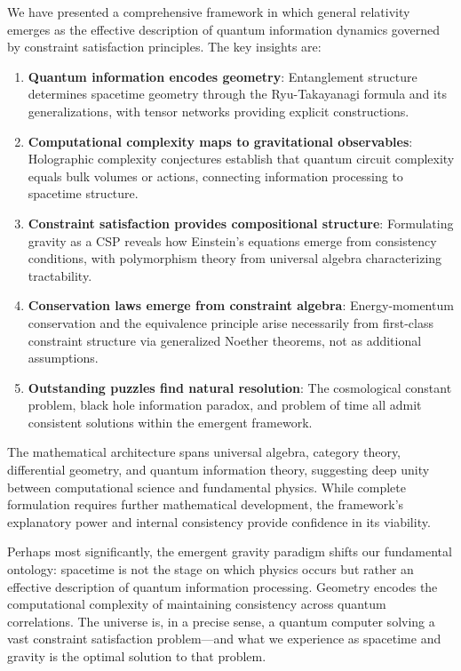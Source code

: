 \documentclass[11pt,a4paper]{article}
\theoremstyle{remark}
\theoremstyle{definition}
\begin{document}
We have presented a comprehensive framework in which general relativity emerges as the effective description of quantum information dynamics governed by constraint satisfaction principles. The key insights are:

\begin{enumerate}
\item \textbf{Quantum information encodes geometry}: Entanglement structure determines spacetime geometry through the Ryu-Takayanagi formula and its generalizations, with tensor networks providing explicit constructions.

\item \textbf{Computational complexity maps to gravitational observables}: Holographic complexity conjectures establish that quantum circuit complexity equals bulk volumes or actions, connecting information processing to spacetime structure.

\item \textbf{Constraint satisfaction provides compositional structure}: Formulating gravity as a CSP reveals how Einstein's equations emerge from consistency conditions, with polymorphism theory from universal algebra characterizing tractability.

\item \textbf{Conservation laws emerge from constraint algebra}: Energy-momentum conservation and the equivalence principle arise necessarily from first-class constraint structure via generalized Noether theorems, not as additional assumptions.

\item \textbf{Outstanding puzzles find natural resolution}: The cosmological constant problem, black hole information paradox, and problem of time all admit consistent solutions within the emergent framework.
\end{enumerate}

The mathematical architecture spans universal algebra, category theory, differential geometry, and quantum information theory, suggesting deep unity between computational science and fundamental physics. While complete formulation requires further mathematical development, the framework's explanatory power and internal consistency provide confidence in its viability.

Perhaps most significantly, the emergent gravity paradigm shifts our fundamental ontology: spacetime is not the stage on which physics occurs but rather an effective description of quantum information processing. Geometry encodes the computational complexity of maintaining consistency across quantum correlations. The universe is, in a precise sense, a quantum computer solving a vast constraint satisfaction problem—and what we experience as spacetime and gravity is the optimal solution to that problem.
\end{document}
